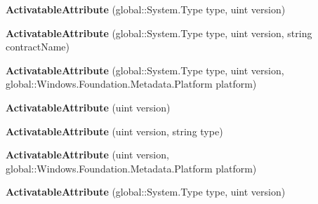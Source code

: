 \begin{DoxyCompactItemize}
\item 
\mbox{\label{class_windows_1_1_foundation_1_1_metadata_1_1_activatable_attribute_a0c631c7846b8e88aacfc234b13f25fa3}} 
{\bfseries Activatable\+Attribute} (global\+::\+System.\+Type type, uint version)
\item 
\mbox{\label{class_windows_1_1_foundation_1_1_metadata_1_1_activatable_attribute_a765085efebfd0bcd0be210e056f09933}} 
{\bfseries Activatable\+Attribute} (global\+::\+System.\+Type type, uint version, string contract\+Name)
\item 
\mbox{\label{class_windows_1_1_foundation_1_1_metadata_1_1_activatable_attribute_a406f07b4e02527c717e7403d999d4443}} 
{\bfseries Activatable\+Attribute} (global\+::\+System.\+Type type, uint version, global\+::\+Windows.\+Foundation.\+Metadata.\+Platform platform)
\item 
\mbox{\label{class_windows_1_1_foundation_1_1_metadata_1_1_activatable_attribute_acdb0cd22e6352e90c6da8ee2c53564ce}} 
{\bfseries Activatable\+Attribute} (uint version)
\item 
\mbox{\label{class_windows_1_1_foundation_1_1_metadata_1_1_activatable_attribute_a74a27250c3f2d52a6ab6bc53f78594df}} 
{\bfseries Activatable\+Attribute} (uint version, string type)
\item 
\mbox{\label{class_windows_1_1_foundation_1_1_metadata_1_1_activatable_attribute_a94c9a8436dde14583be0384f58dde314}} 
{\bfseries Activatable\+Attribute} (uint version, global\+::\+Windows.\+Foundation.\+Metadata.\+Platform platform)
\item 
\mbox{\label{class_windows_1_1_foundation_1_1_metadata_1_1_activatable_attribute_a0c631c7846b8e88aacfc234b13f25fa3}} 
{\bfseries Activatable\+Attribute} (global\+::\+System.\+Type type, uint version)

\end{DoxyCompactItemize}
